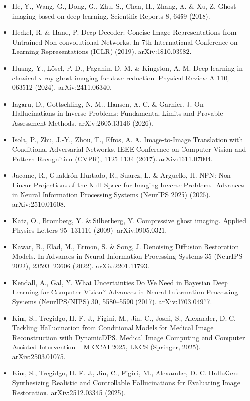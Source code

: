 \documentclass[11pt]{article}
\begin{document}
\begin{itemize}
\item He, Y., Wang, G., Dong, G., Zhu, S., Chen, H., Zhang, A. \& Xu, Z. Ghost imaging based on deep learning. Scientific Reports 8, 6469 (2018).
\item Heckel, R. \& Hand, P. Deep Decoder: Concise Image Representations from Untrained Non-convolutional Networks. In 7th International Conference on Learning Representations (ICLR) (2019). arXiv:1810.03982.
\item Huang, Y., Lösel, P. D., Paganin, D. M. \& Kingston, A. M. Deep learning in classical x-ray ghost imaging for dose reduction. Physical Review A 110, 063512 (2024). arXiv:2411.06340.
\item Iagaru, D., Gottschling, N. M., Hansen, A. C. \& Garnier, J. On Hallucinations in Inverse Problems: Fundamental Limits and Provable Assessment Methods. arXiv:2605.13146 (2026).
\item Isola, P., Zhu, J.-Y., Zhou, T., Efros, A. A. Image-to-Image Translation with Conditional Adversarial Networks. IEEE Conference on Computer Vision and Pattern Recognition (CVPR), 1125-1134 (2017). arXiv:1611.07004.
\item Jacome, R., Gualdrón-Hurtado, R., Suarez, L. \& Arguello, H. NPN: Non-Linear Projections of the Null-Space for Imaging Inverse Problems. Advances in Neural Information Processing Systems (NeurIPS 2025) (2025). arXiv:2510.01608.
\item Katz, O., Bromberg, Y. \& Silberberg, Y. Compressive ghost imaging. Applied Physics Letters 95, 131110 (2009). arXiv:0905.0321.
\item Kawar, B., Elad, M., Ermon, S. \& Song, J. Denoising Diffusion Restoration Models. In Advances in Neural Information Processing Systems 35 (NeurIPS 2022), 23593--23606 (2022). arXiv:2201.11793.
\item Kendall, A., Gal, Y. What Uncertainties Do We Need in Bayesian Deep Learning for Computer Vision? Advances in Neural Information Processing Systems (NeurIPS/NIPS) 30, 5580--5590 (2017). arXiv:1703.04977.
\item Kim, S., Tregidgo, H. F. J., Figini, M., Jin, C., Joshi, S., Alexander, D. C. Tackling Hallucination from Conditional Models for Medical Image Reconstruction with DynamicDPS. Medical Image Computing and Computer Assisted Intervention -- MICCAI 2025, LNCS (Springer, 2025). arXiv:2503.01075.
\item Kim, S., Tregidgo, H. F. J., Jin, C., Figini, M., Alexander, D. C. HalluGen: Synthesizing Realistic and Controllable Hallucinations for Evaluating Image Restoration. arXiv:2512.03345 (2025).

\end{itemize}
\end{document}
